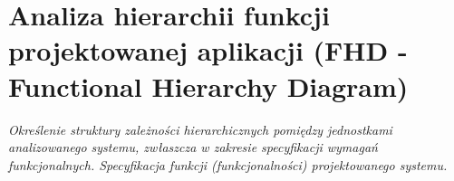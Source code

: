 \section{Analiza hierarchii funkcji projektowanej aplikacji (FHD - Functional Hierarchy
Diagram)}
\textit{Określenie struktury zależności hierarchicznych pomiędzy jednostkami
analizowanego systemu, zwłaszcza w zakresie specyfikacji wymagań funkcjonalnych.
Specyfikacja funkcji (funkcjonalności) projektowanego systemu.} \\

